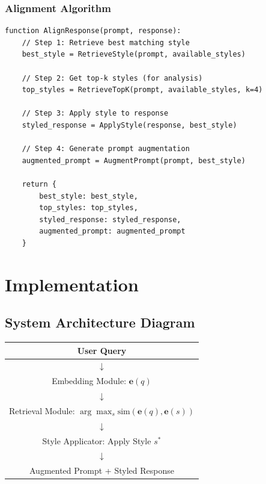 \documentclass[11pt,a4paper]{article}
\begin{document}
\subsubsection{Alignment Algorithm}

\begin{lstlisting}[caption={Complete Alignment Algorithm}]
function AlignResponse(prompt, response):
    // Step 1: Retrieve best matching style
    best_style = RetrieveStyle(prompt, available_styles)
    
    // Step 2: Get top-k styles (for analysis)
    top_styles = RetrieveTopK(prompt, available_styles, k=4)
    
    // Step 3: Apply style to response
    styled_response = ApplyStyle(response, best_style)
    
    // Step 4: Generate prompt augmentation
    augmented_prompt = AugmentPrompt(prompt, best_style)
    
    return {
        best_style: best_style,
        top_styles: top_styles,
        styled_response: styled_response,
        augmented_prompt: augmented_prompt
    }
\end{lstlisting}

\section{Implementation}

\subsection{System Architecture Diagram}

\begin{center}
\begin{tabular}{|c|}
\hline
User Query \\
\hline
$\downarrow$ \\
\hline
Embedding Module: $\mathbf{e}(q)$ \\
\hline
$\downarrow$ \\
\hline
Retrieval Module: $\arg\max_s \text{sim}(\mathbf{e}(q), \mathbf{e}(s))$ \\
\hline
$\downarrow$ \\
\hline
Style Applicator: Apply Style $s^*$ \\
\hline
$\downarrow$ \\
\hline
Augmented Prompt + Styled Response \\
\hline
\end{tabular}
\end{center}
\end{document}
